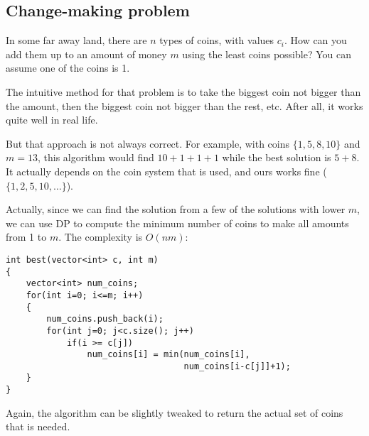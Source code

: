 \subsection{Change-making problem}

In some far away land, there are $n$ types of coins, with values $c_i$.
How can you add them up to an amount of money $m$ using the least coins
possible? You can assume one of the coins is 1.

The intuitive method for that problem is to take the biggest coin
not bigger than the amount, then the biggest coin not bigger than the rest, etc.
After all, it works quite well in real life.

But that approach is not always correct.
For example, with coins $\{1,5,8,10\}$ and $m=13$, this algorithm would find
$10+1+1+1$ while the best solution is $5+8$.
It actually depends on the coin system that is used, and ours works fine
($\{1,2,5,10,\ldots\}$).

Actually, since we can find the solution from a few of the solutions
with lower $m$, we can use DP to compute the minimum number of coins
to make all amounts from 1 to $m$.
The complexity is $O(nm)$:
\begin{verbatim}
int best(vector<int> c, int m)
{
    vector<int> num_coins;
    for(int i=0; i<=m; i++)
    {
        num_coins.push_back(i);
        for(int j=0; j<c.size(); j++)
            if(i >= c[j])
                num_coins[i] = min(num_coins[i],
                                   num_coins[i-c[j]]+1);
    }
}
\end{verbatim}
Again, the algorithm can be slightly tweaked to return the actual
set of coins that is needed.
